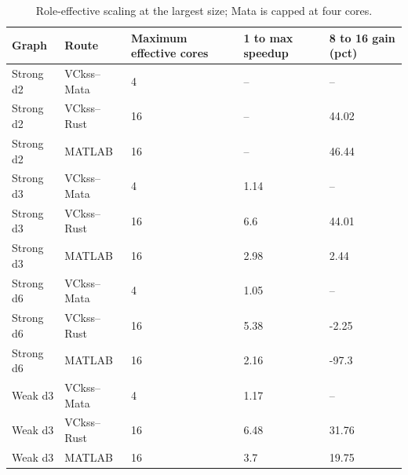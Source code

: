 \begin{table}[htbp]
\centering
\caption{Role-effective scaling at the largest size; Mata is capped at four cores.}
\label{tab:scaling}
\begin{tabular}{lllll}
\toprule
Graph & Route & Maximum effective cores & 1 to max speedup & 8 to 16 gain (pct) \\
\midrule
Strong d2 & VCkss--Mata & 4 & -- & -- \\
Strong d2 & VCkss--Rust & 16 & -- & 44.02 \\
Strong d2 & MATLAB & 16 & -- & 46.44 \\
Strong d3 & VCkss--Mata & 4 & 1.14 & -- \\
Strong d3 & VCkss--Rust & 16 & 6.6 & 44.01 \\
Strong d3 & MATLAB & 16 & 2.98 & 2.44 \\
Strong d6 & VCkss--Mata & 4 & 1.05 & -- \\
Strong d6 & VCkss--Rust & 16 & 5.38 & -2.25 \\
Strong d6 & MATLAB & 16 & 2.16 & -97.3 \\
Weak d3 & VCkss--Mata & 4 & 1.17 & -- \\
Weak d3 & VCkss--Rust & 16 & 6.48 & 31.76 \\
Weak d3 & MATLAB & 16 & 3.7 & 19.75 \\
\bottomrule
\end{tabular}
\end{table}
